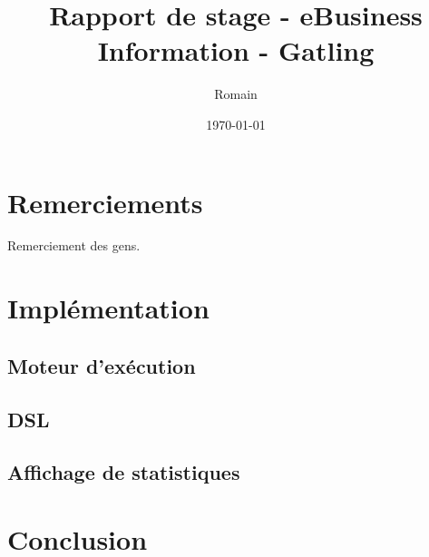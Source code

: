 \documentclass[12pt]{book}
\title{Rapport de stage - eBusiness Information - Gatling}
\author{Romain \bsc{Sertelon}}
\date{\today}
\begin{document}


\frontmatter

\chapter{Remerciements}
Remerciement des gens.
  
\tableofcontents


\mainmatter








  
\chapter{Implémentation}
\section{Moteur d'exécution}
\section{DSL}
\section{Affichage de statistiques}
  
\chapter{Conclusion}
  
\end{document}
